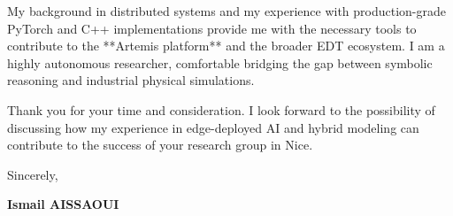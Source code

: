 \documentclass[a4paper,12pt]{article}
\begin{document}
My background in distributed systems and my experience with production-grade PyTorch and C++ implementations provide me with the necessary tools to contribute to the **Artemis platform** and the broader EDT ecosystem. I am a highly autonomous researcher, comfortable bridging the gap between symbolic reasoning and industrial physical simulations.

Thank you for your time and consideration. I look forward to the possibility of discussing how my experience in edge-deployed AI and hybrid modeling can contribute to the success of your research group in Nice.

Sincerely,

\bigskip

\textbf{Ismail AISSAOUI}
\end{document}
